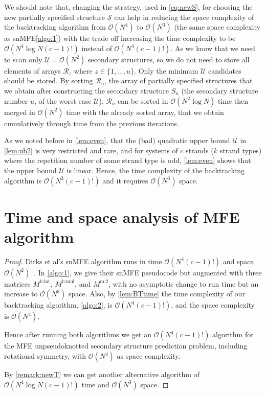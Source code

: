 \documentclass[11pt,letterpaper]{article}  \usepackage[margin=1in]{geometry}
\theoremstyle{definition}  \newtheorem{Definition}[theorem]{Definition}
\newcommand{\snMFE}{snMFE\xspace}
\begin{document}
\begin{remark}\label{remark:newT}
	We should note that, changing the strategy, used in \cref{eq:newS}, for choosing the new partially specified structure $\mathcal{S}$ can help in reducing the space complexity of the backtracking algorithm from $\mathcal{O}(N^4)$ to $\mathcal{O}(N^3)$ (the same space complexity as \snMFE \cref{algo:1}) with the trade off increasing the time complexity to be $\mathcal{O}(N^4 \log N(c-1)!)$ instead of $\mathcal{O}(N^4 (c-1)!)$. As we know that we need to scan only $\mathcal{U} = \mathcal{O}(N^2)$ secondary structures, so we do not need to store all elements of arrays $\mathcal{R}_z$ where $z \in \{1,\ldots,u\}$. 
	Only the minimum $\mathcal{U}$ candidates should be stored. By sorting $\mathcal{R}_u$, the array of partially specified structures that we obtain after constructing the secondary structure $S_u$ (the secondary structure number $u$, of the worst case $\mathcal{U}$). $\mathcal{R}_u$ can be sorted in $\mathcal{O}(N^2 \log N)$ time then merged in $\mathcal{O}(N^2)$ time with the already sorted array, that we obtain cumulatively through time from the previous iterations.        
\end{remark} 

As we noted before in \cref{lem:even}, that the (bad) quadratic upper bound $\mathcal{U}$ in \cref{lem:ub2} is very restricted and rare, and 
for systems of $c$ strands ($k$ strand types) where the repetition number of some strand type is odd, \cref{lem:even} shows that the upper bound $\mathcal{U}$ is linear. Hence, the time complexity of the backtracking algorithm is $\mathcal{O}(N^3(c-1)!)$ and it requires $\mathcal{O}(N^3)$ space.




\section{Time and space analysis of MFE algorithm}\label{sec:analysis}

\main*


\begin{proof}
	Dirks et al's \snMFE algorithm runs in time $\mathcal{O}(N^4 (c-1)!)$ and space $\mathcal{O}(N^2)$~\cite{dirks2007thermodynamic}. 
	In \cref{algo:1}, we give their  \snMFE pseudocode but augmented with three  matrices $M^\text{b:int}$, $M^\text{b:mul}$, and $M^\text{m:2}$,  
	with no asymptotic change to run time but an increase to $\mathcal{O}(N^3)$ space. 
	Also, by \cref{lem:BTtime} the time complexity of our backtracking algorithm, \cref{algo:2}, is $\mathcal{O}(N^4 (c-1)!)$, and the space complexity is $\mathcal{O}(N^4)$.
	
	Hence after running both algorithms we get an 
	$\mathcal{O}(N^4 (c-1)!)$ algorithm for the 
	MFE unpseudoknotted secondary structure prediction problem, including rotational symmetry, with  $\mathcal{O}(N^4)$ as space complexity.
	
	By \cref{remark:newT} we can get another alternative algorithm of  $\mathcal{O}(N^4 \log N(c-1)!)$ time and $\mathcal{O}(N^3)$ space. 
\end{proof}
\end{document}
